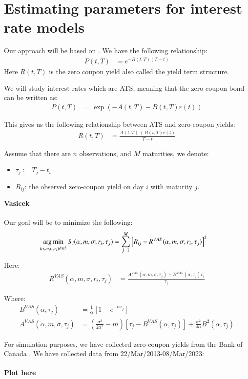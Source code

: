 \chapter{Estimating parameters for interest rate models}

Our approach will be based on \cite{halga2014}. We have the following relationship: 
\begin{align*}
P(t,T) &= e^{-R(t,T)(T-t)}
\end{align*}
Here $R(t,T)$ is the zero coupon yield also called the yield term structure. 


We will study interest rates which are ATS, meaning that the zero-coupon bond can be written as:
\begin{align*}
P(t,T) &= 
\exp\left(
-A(t,T) -B(t,T)r(t)
\right)
\end{align*}

This gives us the following relationship between ATS and zero-coupon yields: 
\begin{align*}
R(t,T) &= \frac{
A(t,T) + B(t,T)r(t)
}{
T-t
}    
\end{align*}

Assume that there are $n$ observations, and $M$ maturities, we denote: 
\begin{itemize}
    \item $\tau_{j} := T_{j} - t_{i}$
    \item $R_{ij}$: the observed zero-coupon yield on day $i$ with maturity $j$. 
\end{itemize}

\textbf{Vasicek}
\\~\\
Our goal will be to minimize the following: 
\begin{align*}
\operatorname*{arg\,min}\limits_{(\alpha, m, \sigma, r_{i}) \in \mathbb{R}^{4}}
S_{i}(\alpha, m, \sigma, r_{i}, \tau_{j}) 
&= 
\sum_{j=1}^{M}\left[
R_{ij} - R^{VAS}(\alpha, m, \sigma, r_{i}, \tau_{j})
\right]^{2}
\end{align*}

Here: 
\begin{align*}
R^{VAS}(\alpha, m, \sigma, r_{i}, \tau_{j})
&= 
\frac{
A^{VAS}(\alpha, m, \sigma, \tau_{j}) + B^{VAS}(\alpha, \tau_{j})r_{i}
}{
\tau_{j}
} 
\end{align*}

Where: 
\begin{align*}
B^{VAS}(\alpha, \tau_{j}) &= \frac{1}{\alpha}\left[
1 - e^{-\alpha \tau_{j}}
\right] \\ 
A^{VAS}(\alpha, m, \sigma, \tau_{j})
&= 
\left(
\frac{\sigma^{2}}{2\alpha^{2}} - m
\right)\left[
\tau_{j} - B^{VAS}(\alpha, \tau_{j})
\right]
+ \frac{\sigma^{2}}{4\alpha}B^{2}(\alpha, \tau_{j})
\end{align*}



\newpage 
For simulation purposes, we have collected zero-coupon yields from the Bank of Canada \cite{Canada_termyields}. We have collected data from 22/Mar/2013-08/Mar/2023: 
\\~\\ 
\textbf{Plot here}
\\~\\



